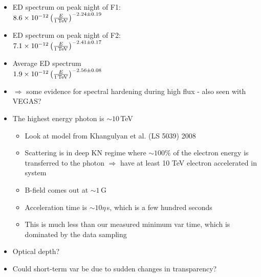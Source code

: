 \documentclass[preprint2]{aastex}
\begin{document}
\begin{itemize}
\begin{itemize}
  \end{itemize}
  \item ED spectrum on peak night of F1: \\$8.6 \times 10^{-12} \left( \frac{E}{1\,\mbox{\scriptsize{TeV}}} \right)^{-2.24 \pm 0.19}$
  \item ED spectrum on peak night of F2: \\$7.1 \times 10^{-12} \left( \frac{E}{1\,\mbox{\scriptsize{TeV}}} \right)^{-2.41 \pm 0.17}$
  \item Average ED spectrum \\$1.9 \times 10^{-12} \left( \frac{E}{1\,\mbox{\scriptsize{TeV}}} \right)^{-2.56 \pm 0.08}$
  \item $\Rightarrow$ some evidence for spectral hardening during high flux - also seen with VEGAS?
  \item The highest energy photon is $\sim10$\,TeV
    \begin{itemize}
      \item Look at model from Khangulyan et al. (LS 5039) 2008
      \item Scattering is in deep KN regime where $\sim100\%$ of the electron energy is transferred to the photon $\Rightarrow$ have at least 10 TeV electron accelerated in system
      \item B-field comes out at $\sim1$\,G
      \item Acceleration time is $\sim10\eta$\,s, which is a few hundred seconds
      \item This is much less than our measured minimum var time, which is dominated by the data sampling
      \end{itemize}
  \item Optical depth?
  \item Could short-term var be due to sudden changes in transparency?
\end{itemize}



\end{document}
